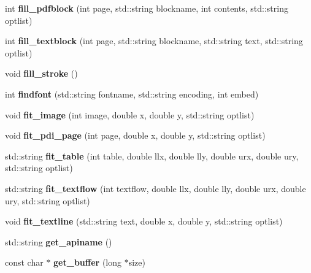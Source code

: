 \begin{DoxyCompactItemize}
int {\bfseries fill\+\_\+pdfblock} (int page, std\+::string blockname, int contents, std\+::string optlist)
\item 
\hypertarget{classPDFlib_ad89aba96aa68737607b7c5f4f419bf33}{}\label{classPDFlib_ad89aba96aa68737607b7c5f4f419bf33} 
int {\bfseries fill\+\_\+textblock} (int page, std\+::string blockname, std\+::string text, std\+::string optlist)
\item 
\hypertarget{classPDFlib_af075d64fe8d704204883c548b7d48460}{}\label{classPDFlib_af075d64fe8d704204883c548b7d48460} 
void {\bfseries fill\+\_\+stroke} ()
\item 
\hypertarget{classPDFlib_a07e3c184619af04184b342136c97b30a}{}\label{classPDFlib_a07e3c184619af04184b342136c97b30a} 
int {\bfseries findfont} (std\+::string fontname, std\+::string encoding, int embed)
\item 
\hypertarget{classPDFlib_ae190bced58224501fce22ab778e7855b}{}\label{classPDFlib_ae190bced58224501fce22ab778e7855b} 
void {\bfseries fit\+\_\+image} (int image, double x, double y, std\+::string optlist)
\item 
\hypertarget{classPDFlib_aec960d2bb746ba340bcb0e275393aea4}{}\label{classPDFlib_aec960d2bb746ba340bcb0e275393aea4} 
void {\bfseries fit\+\_\+pdi\+\_\+page} (int page, double x, double y, std\+::string optlist)
\item 
\hypertarget{classPDFlib_a8049e74f5bd6a63ed988dcbca887ea40}{}\label{classPDFlib_a8049e74f5bd6a63ed988dcbca887ea40} 
std\+::string {\bfseries fit\+\_\+table} (int table, double llx, double lly, double urx, double ury, std\+::string optlist)
\item 
\hypertarget{classPDFlib_ad8d24aaccdc61e3f482594269e7db1de}{}\label{classPDFlib_ad8d24aaccdc61e3f482594269e7db1de} 
std\+::string {\bfseries fit\+\_\+textflow} (int textflow, double llx, double lly, double urx, double ury, std\+::string optlist)
\item 
\hypertarget{classPDFlib_ad451733ee7844848d649a1e1a551623c}{}\label{classPDFlib_ad451733ee7844848d649a1e1a551623c} 
void {\bfseries fit\+\_\+textline} (std\+::string text, double x, double y, std\+::string optlist)
\item 
\hypertarget{classPDFlib_a84199831e344c9705e47ea184e92a650}{}\label{classPDFlib_a84199831e344c9705e47ea184e92a650} 
std\+::string {\bfseries get\+\_\+apiname} ()
\item 
\hypertarget{classPDFlib_a29b236d867ff4067adf448ce031283eb}{}\label{classPDFlib_a29b236d867ff4067adf448ce031283eb} 
const char $\ast$ {\bfseries get\+\_\+buffer} (long $\ast$size)

\end{DoxyCompactItemize}
